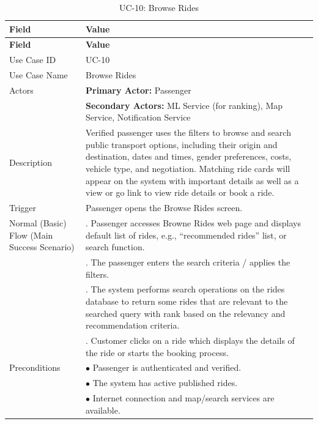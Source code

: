 \begin{longtable}{|>{\raggedright\arraybackslash}p{4cm}|>{\raggedright\arraybackslash}p{11cm}|}
\caption{UC-10: Browse Rides}
\label{tab:uc-10} \\
\hline
\rowcolor{lightgray!30}
\textbf{Field} & \textbf{Value} \\
\hline
\endfirsthead
\hline
\rowcolor{lightgray!30}
\textbf{Field} & \textbf{Value} \\
\hline
\endhead
\hline
\endfoot
\hline
\endlastfoot
Use Case ID & UC-10 \\
\hline
Use Case Name & Browse Rides \\
\hline
Actors & \textbf{Primary Actor:} Passenger \\
& \textbf{Secondary Actors:} ML Service (for ranking), Map Service, Notification Service \\
\hline
Description & Verified passenger uses the filters to browse and search public transport options, including their origin and destination, dates and times, gender preferences, costs, vehicle type, and negotiation. Matching ride cards will appear on the system with important details as well as a view or go link to view ride details or book a ride. \\
\hline
Trigger & Passenger opens the Browse Rides screen. \\
\hline
Normal (Basic) Flow (Main Success Scenario) & 1. Passenger accesses Browne Rides web page and displays default list of rides, e.g., “recommended rides” list, or search function. \\
& 2. The passenger enters the search criteria / applies the filters. \\
& 3. The system performs search operations on the rides database to return some rides that are relevant to the searched query with rank based on the relevancy and recommendation criteria. \\
& 4. Customer clicks on a ride which displays the details of the ride or starts the booking process. \\
\hline
Preconditions & $\bullet$ Passenger is authenticated and verified. \\
& $\bullet$ The system has active published rides. \\
& $\bullet$ Internet connection and map/search services are available. \\

\end{longtable}
